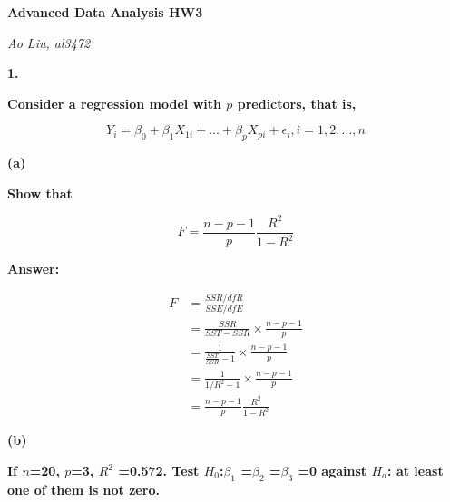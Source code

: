 \documentclass[letterpaper,11pt]{article}
\begin{document}
  \begin{center}
  	\textbf{\Huge{Advanced Data Analysis HW3}}
  \end{center}

  \begin{center}
  	\textsl{Ao Liu, al3472}
  \end{center}


  \bigbreak
  \bigbreak
  \bigbreak


\begin{addmargin}[-2em]{0em}
\large{\textbf{1. }}\end{addmargin}
\begin{addmargin}[-1.1em]{0em} \textbf{Consider a regression model with $p$ predictors, that is,}\par \end{addmargin}
  $$Y_i = \beta_0+\beta_1 X_{1i}+...+\beta_p X_{pi}+\epsilon_i,i=1,2,...,n$$
\bigbreak

\begin{addmargin}[-1.1em]{0em}
\textbf{(a)}\par\end{addmargin}
\textbf{Show that}\par
$$F=\frac{n-p-1}{p}\frac{R^2}{1-R^2}$$

\begin{addmargin}[-0.5em]{0em}
\textbf{Answer: }\end{addmargin}


\begin{align}
F &= \frac{SSR/dfR}{SSE/dfE} \nonumber\\
  &= \frac{SSR}{SST-SSR}\times\frac{n-p-1}{p} \nonumber\\
  &= \frac{1}{\frac{SST}{SSR}-1}\times\frac{n-p-1}{p}\nonumber\\
  &= \frac{1}{1/R^2-1}\times\frac{n-p-1}{p}\nonumber\\
  &= \frac{n-p-1}{p}\frac{R^2}{1-R^2}\nonumber
\end{align}


\begin{addmargin}[-1.1em]{0em}
\textbf{(b)}\par\end{addmargin}
  \textbf{If $n$=20, $p$=3, $R^2$ =0.572. Test $H_0$:$\beta_1$ =$\beta_2$ =$\beta_3$ =0 against $H_a$: at least one of them is not zero.}\par
\bigbreak
\end{document}
